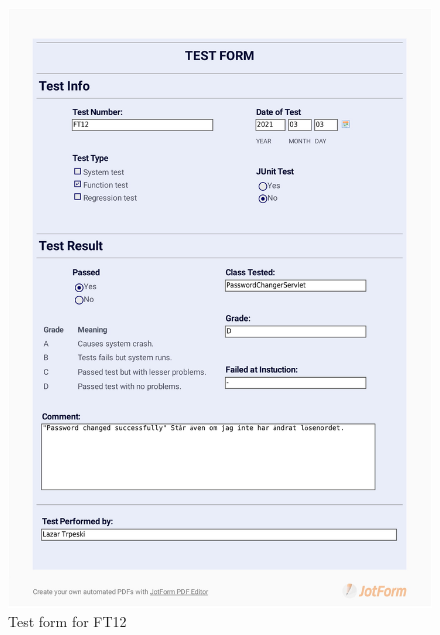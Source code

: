 \documentclass{article}
\begin{document}
 \begin{figure}
     \centering
     \includegraphics[width=13cm]{images/2021-03-03_Lazar_FT12-1}
     \renewcommand\figurename{Figure}
     \caption{Test form for FT12}
     \label{fig:my_label}
 \end{figure}
 
\end{document}
